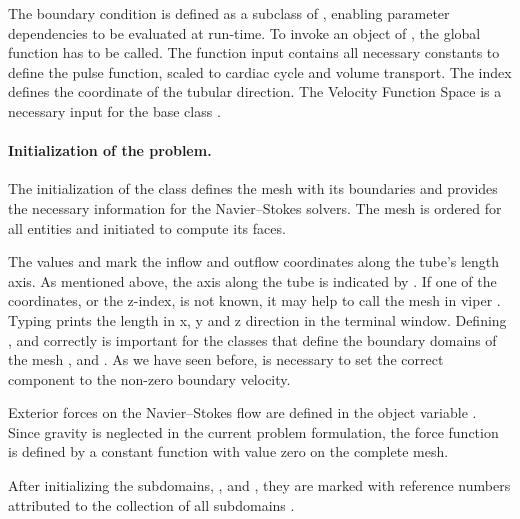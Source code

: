 The boundary condition  is defined as a subclass of
, enabling parameter dependencies to be evaluated at run-time. To invoke an object of , the global function
 has to be called. The function input
contains all necessary constants to define the pulse function, scaled
to cardiac cycle and volume transport. The index 
defines the coordinate of the tubular direction. The Velocity Function
Space  is a necessary input for the base class .

\paragraph{Initialization of the problem.} The initialization of the class
 defines the mesh with its boundaries and provides the
necessary information for the Navier--Stokes solvers. The mesh is ordered for all entities and initiated to compute its faces.

The values  and  mark the inflow and outflow
coordinates along the tube's length axis. As mentioned above, the axis
along the tube is indicated by . If one of the
coordinates, or the z-index, is not known, it may help to call the mesh
in viper . Typing  prints the
length in x, y and z direction in the terminal window. Defining
,  and  correctly is important
for the classes that define the boundary domains of the mesh
,  and . As we have seen before,
 is necessary to set the correct component to the
non-zero boundary velocity.

Exterior forces on the Navier--Stokes flow are defined in the object variable . Since gravity is neglected in the current problem formulation, the force function  is defined by a constant function  with value zero on the complete mesh.

After initializing the subdomains, ,  and , they are marked with reference numbers attributed to the collection of all 
subdomains .

